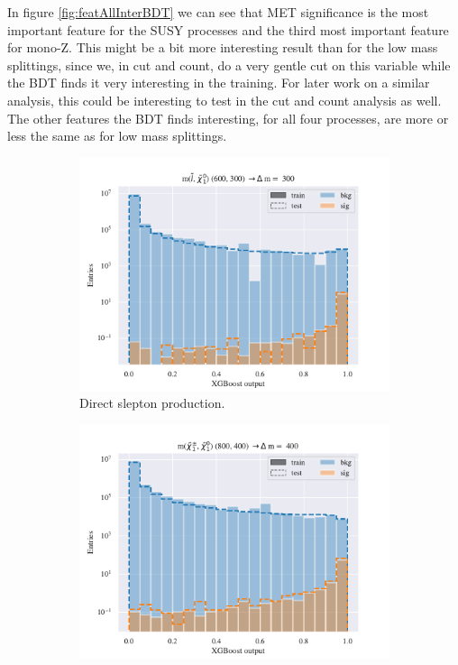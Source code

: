 In figure \ref{fig:featAllInterBDT} we can see that MET significance is the most important feature for the SUSY processes and the third most important feature for mono-Z. This might be a bit more interesting result than for the low mass splittings, since we, in cut and count, do a very gentle cut on this variable while the BDT finds it very interesting in the training. For later work on a similar analysis, this could be interesting to test in the cut and count analysis as well. The other features the BDT finds interesting, for all four processes, are more or less the same as for low mass splittings. 

\begin{figure}[H]
    \centering
    \begin{subfigure}[t!]{0.49\textwidth}
        \includegraphics[width = \textwidth]{Figures/SlepSlep/ML/BDT/All_level/Inter/scaled_train_test_396014.pdf}
        \caption{Direct slepton production.}
        \label{fig:SlepslepInter}
    \end{subfigure}
    \begin{subfigure}[t!]{0.49\textwidth}
        \includegraphics[width = \textwidth]{Figures/SlepSnu/BDT/All_level/Inter/scaled_train_test_397150.pdf}

\end{subfigure}
\end{figure}
